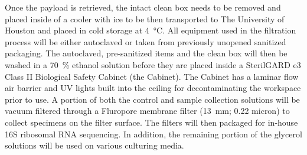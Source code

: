 Once the payload is retrieved, the intact clean box needs to be removed and placed inside of a cooler with ice to be then transported to The University of Houston and placed in cold storage at \SI{4}{\celsius}. All equipment used in the filtration process will be either autoclaved or taken from previously unopened sanitized packaging. The autoclaved, pre-sanitized items and the clean box will then be washed in a \SI{70}{\percent} ethanol solution before they are placed inside a SterilGARD e3 Class II Biological Safety Cabinet (the Cabinet). The Cabinet has a laminar flow air barrier and UV lights built into the ceiling for decontaminating the workspace prior to use. A portion of both the control and sample collection solutions will be vacuum filtered through a Fluropore membrane filter (\SI{13}{\milli\meter}; \num{0.22} micron) to collect specimens on the filter surface.  The filters will then packaged for in-house 16S ribosomal RNA sequencing.  In addition, the remaining portion of the glycerol solutions will be used on various culturing media.



